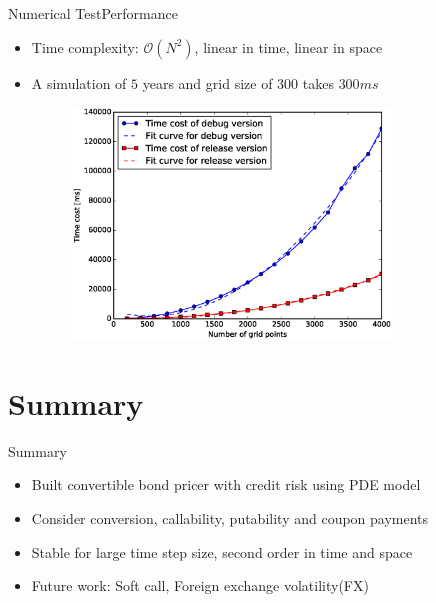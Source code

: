 \documentclass{beamer}
\begin{document}
\begin{frame}{Numerical Test}{Performance}
\begin{itemize}
	\item Time complexity: $\mathcal{O}(N^2)$, linear in time, linear in space
	\item A simulation of $5$ years and grid size of $300$ takes $300 ms$ 
	\begin{figure}
	\centering
	\includegraphics[width=0.8\textwidth]{Figures/timecost}
	\end{figure}
\end{itemize}
\end{frame}

\section{Summary}

\begin{frame}{Summary}{}
\begin{itemize}
	\item Built convertible bond pricer with credit risk using PDE model
	\item Consider conversion, callability, putability and coupon payments
	\item Stable for large time step size, second order in time and space
	\item Future work: Soft call, Foreign exchange volatility(FX)
\end{itemize}
\end{frame}
\end{document}
